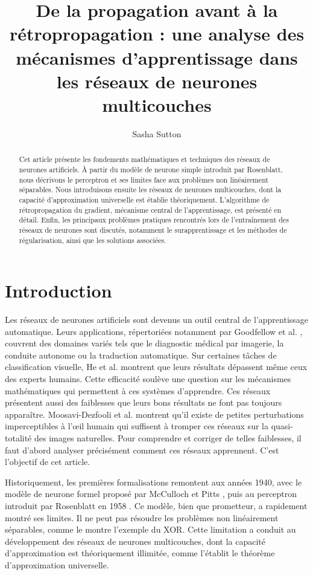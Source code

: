 \documentclass[a4paper,french]{style-LaTeX}
\title{De la propagation avant à la rétropropagation : une analyse des mécanismes d'apprentissage dans les réseaux de neurones multicouches}
\author[1]{Sasha Sutton}
\affil[1]{Aix-Marseille Université, France, \texttt{sasha.sutton@etu.univ-amu.fr}}
\begin{document}
\maketitle

\begin{abstract}
Cet article présente les fondements mathématiques et techniques des réseaux de neurones artificiels. À partir du modèle de neurone simple introduit par Rosenblatt, nous décrivons le perceptron et ses limites face aux problèmes non linéairement séparables. Nous introduisons ensuite les réseaux de neurones multicouches, dont la capacité d'approximation universelle est établie théoriquement. L'algorithme de rétropropagation du gradient, mécanisme central de l'apprentissage, est présenté en détail. Enfin, les principaux problèmes pratiques rencontrés lors de l'entraînement des réseaux de neurones sont discutés, notamment le surapprentissage et les méthodes de régularisation, ainsi que les solutions associées.
\end{abstract}


\section{Introduction}

Les réseaux de neurones artificiels sont devenus un outil central de l'apprentissage automatique. Leurs applications, répertoriées notamment par Goodfellow et al. \cite{Goodfellow16}, couvrent des domaines variés tels que le diagnostic médical par imagerie, la conduite autonome ou la traduction automatique. Sur certaines tâches de classification visuelle, He et al. \cite{He15} montrent que leurs résultats dépassent même ceux des experts humains. Cette efficacité soulève une question sur les mécanismes mathématiques qui permettent à ces systèmes d'apprendre. Ces réseaux présentent aussi des faiblesses que leurs bons résultats ne font pas toujours apparaître. Moosavi-Dezfooli et al. \cite{MoosaviDezfooli17} montrent qu'il existe de petites perturbations imperceptibles à l'œil humain qui suffisent à tromper ces réseaux sur la quasi-totalité des images naturelles. Pour comprendre et corriger de telles faiblesses, il faut d'abord analyser précisément comment ces réseaux apprennent. C'est l'objectif de cet article.

Historiquement, les premières formalisations remontent aux années 1940, avec le modèle de neurone formel proposé par McCulloch et Pitts \cite{McCullochPitts43}, puis au perceptron introduit par Rosenblatt en 1958 \cite{Rosenblatt58}. Ce modèle, bien que prometteur, a rapidement montré ses limites. Il ne peut pas résoudre les problèmes non linéairement séparables, comme le montre l'exemple du XOR. Cette limitation a conduit au développement des réseaux de neurones multicouches, dont la capacité d'approximation est théoriquement illimitée, comme l'établit le théorème d'approximation universelle.
\end{document}

